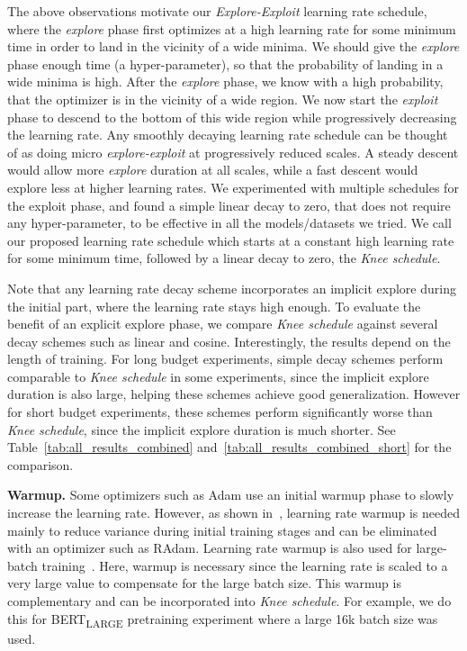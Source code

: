 \documentclass{article} \usepackage{iclr2021_conference,times}
\newcommand{\lrschedule}{\textit{Knee schedule}}
\begin{document}
The above observations motivate our {\it Explore-Exploit} learning rate schedule, where the \textit{explore} phase first optimizes at a high learning rate for some minimum time in order to land in the vicinity of a wide minima. We should give the \textit{explore} phase enough time (a hyper-parameter), so that the probability of landing in a wide minima is high.
After the \textit{explore} phase, we know with a high probability, that the optimizer is in the vicinity of a wide region. We now start the {\it exploit} phase to descend to the bottom of this wide region while progressively decreasing the learning rate. Any smoothly decaying learning rate schedule can be thought of as doing micro \textit{explore-exploit} at progressively reduced scales. A steady descent would allow more \textit{explore} duration at all scales, while a fast descent would explore less at higher learning rates. We experimented with multiple schedules for the exploit phase, and found a simple linear decay to zero, that does not require any hyper-parameter, to be effective in all the models/datasets we tried. We call our proposed learning rate schedule which starts at a constant high learning rate for some minimum time, followed by a linear decay to zero, the \lrschedule{}.

Note that any learning rate decay scheme incorporates an implicit explore during the initial part, where the learning rate stays high enough. To evaluate the benefit of an explicit explore phase, we compare \lrschedule{} against several decay schemes such as linear and cosine. Interestingly, the results depend on the length of training. For long budget experiments, simple decay schemes perform comparable to \lrschedule{} in some experiments, since the implicit explore duration is also large, helping these schemes achieve good generalization. However for short budget experiments, these schemes perform significantly worse than \lrschedule{}, since the implicit explore duration is much shorter. See Table~\ref{tab:all_results_combined} and~\ref{tab:all_results_combined_short} for the comparison.

{\bf Warmup.} Some optimizers such as Adam use an initial warmup phase to slowly increase the learning rate. However, as shown in~\citet{liu2019variance_radam}, learning rate warmup is needed mainly to reduce variance during initial training stages and can be eliminated with an optimizer such as RAdam. Learning rate warmup is also used for large-batch training~\citep{goyal-imagenet-in-an-hour-2017}. Here, warmup is necessary since the learning rate is scaled to a very large value to compensate for the large batch size. This warmup is complementary and can be incorporated into \lrschedule{}. For example, we do this for BERT\textsubscript{LARGE} pretraining experiment where a large 16k batch size was used.
\end{document}
